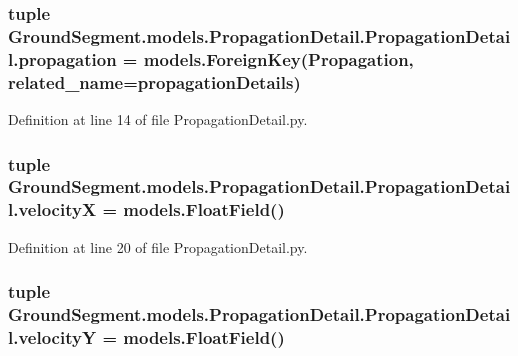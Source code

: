 \subsubsection[{propagation}]{\setlength{\rightskip}{0pt plus 5cm}tuple Ground\+Segment.\+models.\+Propagation\+Detail.\+Propagation\+Detail.\+propagation = models.\+Foreign\+Key({\bf Propagation}, related\+\_\+name=\textquotesingle{}propagation\+Details\textquotesingle{})\hspace{0.3cm}{\ttfamily [static]}}\label{class_ground_segment_1_1models_1_1_propagation_detail_1_1_propagation_detail_a4c6022e53fef3a255ae7d9453e615b52}


Definition at line 14 of file Propagation\+Detail.\+py.

\hypertarget{class_ground_segment_1_1models_1_1_propagation_detail_1_1_propagation_detail_a29de2a45acb09acda6998ce7afb12ed0}{}
\subsubsection[{velocity\+X}]{\setlength{\rightskip}{0pt plus 5cm}tuple Ground\+Segment.\+models.\+Propagation\+Detail.\+Propagation\+Detail.\+velocity\+X = models.\+Float\+Field()\hspace{0.3cm}{\ttfamily [static]}}\label{class_ground_segment_1_1models_1_1_propagation_detail_1_1_propagation_detail_a29de2a45acb09acda6998ce7afb12ed0}


Definition at line 20 of file Propagation\+Detail.\+py.

\hypertarget{class_ground_segment_1_1models_1_1_propagation_detail_1_1_propagation_detail_af415fab52fc62626041d4d7a75604413}{}
\subsubsection[{velocity\+Y}]{\setlength{\rightskip}{0pt plus 5cm}tuple Ground\+Segment.\+models.\+Propagation\+Detail.\+Propagation\+Detail.\+velocity\+Y = models.\+Float\+Field()\hspace{0.3cm}{\ttfamily [static]}}\label{class_ground_segment_1_1models_1_1_propagation_detail_1_1_propagation_detail_af415fab52fc62626041d4d7a75604413}


